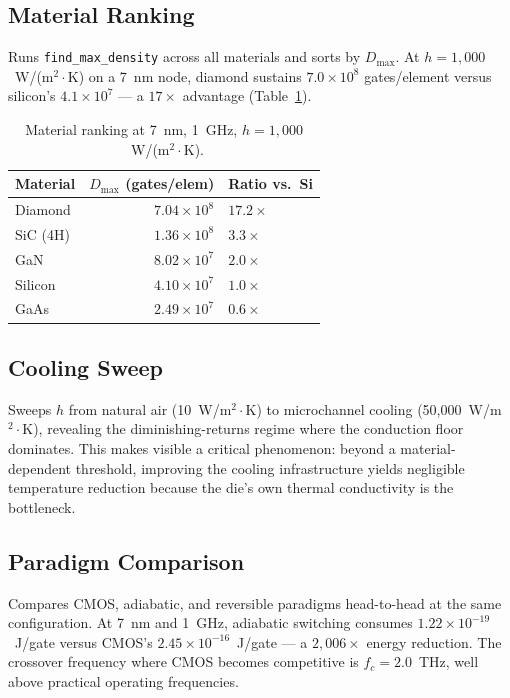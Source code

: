 \documentclass[11pt,twocolumn]{article}
\begin{document}
\subsection{Material Ranking}

Runs \texttt{find\_max\_density} across all materials and sorts by
$D_{\max}$. At $h = 1{,}000$~W/(m$^2\cdot$K) on a 7~nm node,
diamond sustains $7.0 \times 10^8$ gates/element versus silicon's
$4.1 \times 10^7$ --- a $17\times$ advantage (Table~\ref{tab:ranking}).

\begin{table}[t]
\centering
\caption{Material ranking at 7~nm, 1~GHz, $h = 1{,}000$~W/(m$^2\cdot$K).}
\label{tab:ranking}
\small
\begin{tabular}{@{}lrl@{}}
\toprule
Material & $D_{\max}$ (gates/elem) & Ratio vs.\ Si \\
\midrule
Diamond   & $7.04 \times 10^{8}$ & $17.2\times$ \\
SiC (4H)  & $1.36 \times 10^{8}$ & $3.3\times$ \\
GaN       & $8.02 \times 10^{7}$ & $2.0\times$ \\
Silicon   & $4.10 \times 10^{7}$ & $1.0\times$ \\
GaAs      & $2.49 \times 10^{7}$ & $0.6\times$ \\
\bottomrule
\end{tabular}
\end{table}

\subsection{Cooling Sweep}

Sweeps $h$ from natural air (10~W/m$^2\cdot$K) to microchannel
cooling (50{,}000~W/m$^2\cdot$K), revealing the diminishing-returns
regime where the conduction floor dominates. This makes visible a
critical phenomenon: beyond a material-dependent threshold,
improving the cooling infrastructure yields negligible temperature
reduction because the die's own thermal conductivity is the bottleneck.

\subsection{Paradigm Comparison}

Compares CMOS, adiabatic, and reversible paradigms head-to-head at
the same configuration. At 7~nm and 1~GHz, adiabatic switching
consumes $1.22 \times 10^{-19}$~J/gate versus CMOS's $2.45 \times
10^{-16}$~J/gate --- a $2{,}006\times$ energy reduction. The crossover
frequency where CMOS becomes competitive is $f_c = 2.0$~THz,
well above practical operating frequencies.
\end{document}
